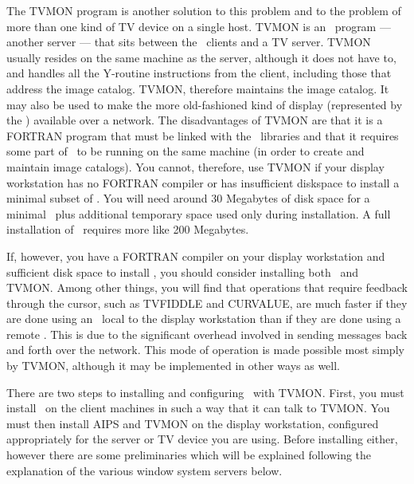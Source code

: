 The TVMON program is another solution to this problem and to the
problem of more than one kind of TV device on a single host.  TVMON is
an \AIPS\ program --- another server --- that sits between the \AIPS\
clients and a TV server.  TVMON usually resides on the same machine as
the server, although it does not have to, and handles all the
Y-routine instructions from the client, including those that address
the image catalog.  TVMON, therefore maintains the image catalog.
It may also be used to make the more old-fashioned kind of display
(represented by the \IIS ) available over a network.  The
disadvantages of TVMON are that it is a FORTRAN program that must be
linked with the \AIPS\ libraries and that it requires some part of
\AIPS\ to be running on the same machine (in order to create and
maintain image catalogs).  You cannot, therefore, use TVMON if your
display workstation has no FORTRAN compiler or has insufficient
diskspace to install a minimal subset of \hbox{\AIPS}.  You will need
around 30 Megabytes of disk space for a minimal \AIPS\ plus additional
temporary space used only during installation.  A full installation of
\AIPS\ requires more like 200 Megabytes.

If, however, you have a FORTRAN compiler on your display workstation
and sufficient disk space to install \AIPS, you should consider
installing both \AIPS\ and \hbox{TVMON}.  Among other things, you will
find that operations that require feedback through the cursor, such as
TVFIDDLE and CURVALUE, are much faster if they are done using an
\AIPS\ local to the display workstation than if they are done using a
remote \hbox{\AIPS}.  This is due to the significant overhead involved
in sending messages back and forth over the network.  This mode of
operation is made possible most simply by TVMON, although it may be
implemented in other ways as well.


There are two steps to installing and configuring \AIPS\ with
\hbox{TVMON}.  First, you must install \AIPS\ on the client machines
in such a way that it can talk to \hbox{TVMON}.  You must then install
AIPS and TVMON on the display workstation, configured appropriately
for the server or TV device you are using.  Before installing either,
however there are some preliminaries which will be explained following
the explanation of the various window system servers below.



